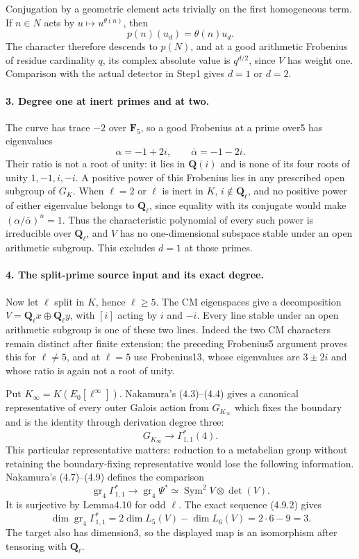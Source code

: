 Conjugation by a geometric element acts trivially on the first homogeneous term. If $n\in N$ acts by $u\mapsto u^{\theta(n)}$, then
\[
 p(n)(u_d)=\theta(n)u_d.
\]
The character therefore descends to $p(N)$, and at a good arithmetic Frobenius of residue cardinality $q$, its complex absolute value is $q^{d/2}$, since $V$ has weight one. Comparison with the actual detector in Step1 gives $d=1$ or $d=2$.

\paragraph{3. Degree one at inert primes and at two.}
The curve has trace $-2$ over $\mathbf F_5$, so a good Frobenius at a prime over5 has eigenvalues
\[
 \alpha=-1+2i,\qquad\bar\alpha=-1-2i.
\]
Their ratio is not a root of unity: it lies in $\mathbf Q(i)$ and is none of its four roots of unity $1,-1,i,-i$. A positive power of this Frobenius lies in any prescribed open subgroup of $G_K$. When $\ell=2$ or $\ell$ is inert in $K$, $i\notin\mathbf Q_\ell$, and no positive power of either eigenvalue belongs to $\mathbf Q_\ell$, since equality with its conjugate would make $(\alpha/\bar\alpha)^n=1$. Thus the characteristic polynomial of every such power is irreducible over $\mathbf Q_\ell$, and $V$ has no one-dimensional subspace stable under an open arithmetic subgroup. This excludes $d=1$ at those primes.

\paragraph{4. The split-prime source input and its exact degree.}
Now let $\ell$ split in $K$, hence $\ell\ge5$. The CM eigenspaces give a decomposition $V=\mathbf Q_\ell x\oplus\mathbf Q_\ell y$, with $[i]$ acting by $i$ and $-i$. Every line stable under an open arithmetic subgroup is one of these two lines. Indeed the two CM characters remain distinct after finite extension; the preceding Frobenius5 argument proves this for $\ell\ne5$, and at $\ell=5$ use Frobenius13, whose eigenvalues are $3\pm2i$ and whose ratio is again not a root of unity.

Put $K_\infty=K(E_0[\ell^\infty])$. Nakamura's (4.3)--(4.4) gives a canonical representative of every outer Galois action from $G_{K_\infty}$ which fixes the boundary and is the identity through derivation degree three:
\[
 G_{K_\infty}\longrightarrow\Gamma^*_{1,1}(4).
\]
This particular representative matters: reduction to a metabelian group without retaining the boundary-fixing representative would lose the following information. Nakamura's (4.7)--(4.9) defines the comparison
\[
 \operatorname{gr}_4\Gamma^*_{1,1}\longrightarrow
 \operatorname{gr}_4\Psi^*\simeq\operatorname{Sym}^2V\otimes\det(V).
\]
It is surjective by Lemma4.10 for odd $\ell$. The exact sequence (4.9.2) gives
\[
 \dim\operatorname{gr}_4\Gamma^*_{1,1}
 =2\dim L_5(V)-\dim L_6(V)=2\cdot6-9=3.
\]
The target also has dimension3, so the displayed map is an isomorphism after tensoring with $\mathbf Q_\ell$.

